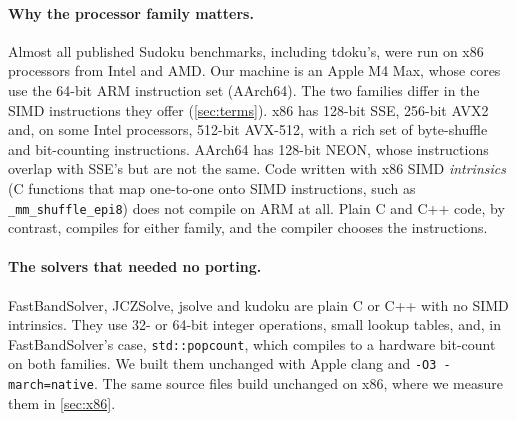 \documentclass[11pt]{article}
\theoremstyle{definition}
\theoremstyle{plain}
\begin{document}
\paragraph{Why the processor family matters.} Almost all published Sudoku benchmarks, including tdoku's, were run on
x86 processors from Intel and AMD. Our machine is an Apple M4 Max, whose cores use the 64-bit ARM instruction set
(AArch64). The two families differ in the SIMD instructions they offer (\cref{sec:terms}). x86 has 128-bit SSE, 256-bit
AVX2 and, on some Intel processors, 512-bit AVX-512, with a rich set of byte-shuffle and bit-counting instructions.
AArch64 has 128-bit NEON, whose instructions overlap with SSE's but are not the same. Code written with x86 SIMD
\emph{intrinsics} (C functions that map one-to-one onto SIMD instructions, such as \texttt{\_mm\_shuffle\_epi8}) does
not compile on ARM at all. Plain C and C++ code, by contrast, compiles for either family, and the compiler chooses the
instructions.

\paragraph{The solvers that needed no porting.} FastBandSolver, JCZSolve, jsolve and kudoku are plain C or C++ with
no SIMD intrinsics. They use 32- or 64-bit integer operations, small lookup tables, and, in FastBandSolver's case,
\texttt{std::popcount}, which compiles to a hardware bit-count on both families. We built them unchanged with Apple
clang and \texttt{-O3 -march=native}. The same source files build unchanged on x86, where we measure them in
\cref{sec:x86}.
\end{document}
